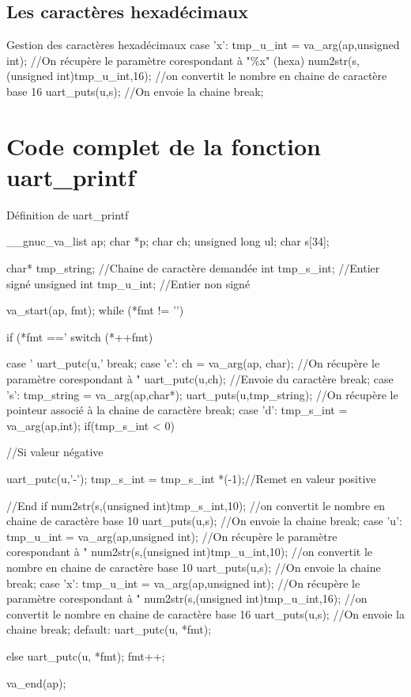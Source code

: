 \subsection{Les caractères hexadécimaux}

\begin{Cpp}{Gestion des caractères hexadécimaux}
	case 'x':
	    tmp_u_int = va_arg(ap,unsigned int);	//On récupère le paramètre corespondant à "\%x" (hexa)
		num2str(s,(unsigned int)tmp_u_int,16);	//on convertit le nombre en chaine de caractère base 16
		uart_puts(u,s);							//On envoie la chaine
		break;
\end{Cpp}

\section{Code complet de la fonction uart\_printf}


\begin{Cpp}{Définition de uart\_printf}

	__gnuc_va_list ap;
	char          *p;
	char           ch;
	unsigned long  ul;
	char           s[34];

	char* tmp_string;		//Chaine de caractère demandée
	int tmp_s_int;			//Entier signé
	unsigned int tmp_u_int; //Entier non signé
	
	va_start(ap, fmt);
	while (*fmt != '\0') {
		if (*fmt =='%
			switch (*++fmt) {
				case '%
					uart_putc(u,'%
					break;
				case 'c':
					ch = va_arg(ap, char);  	//On récupère le paramètre corespondant à "%
					uart_putc(u,ch); 			//Envoie du caractère
					break;
				case 's':
					tmp_string = va_arg(ap,char*);
					uart_puts(u,tmp_string); //On récupère le pointeur associé à la chaine de caractère
					break;
				case 'd':
					tmp_s_int = va_arg(ap,int);
					if(tmp_s_int < 0) { //Si valeur négative
						
						uart_putc(u,'-'); 
						tmp_s_int = tmp_s_int *(-1);//Remet en valeur positive
					}//End if
					num2str(s,(unsigned int)tmp_s_int,10);	//on convertit le nombre en chaine de caractère base 10
					uart_puts(u,s);						//On envoie la chaine
					break;
				case 'u':
					tmp_u_int = va_arg(ap,unsigned int);	//On récupère le paramètre corespondant à "%
					num2str(s,(unsigned int)tmp_u_int,10);	//on convertit le nombre en chaine de caractère base 10
					uart_puts(u,s);							//On envoie la chaine
					break;
				case 'x':
					tmp_u_int = va_arg(ap,unsigned int);	//On récupère le paramètre corespondant à "%
					num2str(s,(unsigned int)tmp_u_int,16);	//on convertit le nombre en chaine de caractère base 16
					uart_puts(u,s);							//On envoie la chaine
					break;
				default:
				    uart_putc(u, *fmt);
			}
		} else uart_putc(u, *fmt);
		fmt++;
	
	va_end(ap);
\end{Cpp}

